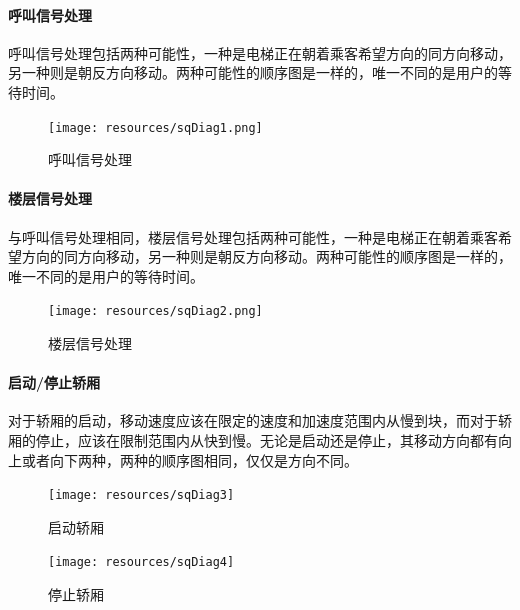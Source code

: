 \begin{minipage}{\textwidth}
\paragraph{呼叫信号处理}
呼叫信号处理包括两种可能性，一种是电梯正在朝着乘客希望方向的同方向移动，另一种则是朝反方向移动。两种可能性的顺序图是一样的，唯一不同的是用户的等待时间。
\begin{figure}[H]
	\centering
	\texttt{[image: resources/sqDiag1.png]}
	\caption{呼叫信号处理}
	\label{fig:sqDiag1}
\end{figure}
\end{minipage}

\begin{minipage}{\textwidth}
\paragraph{楼层信号处理}
与呼叫信号处理相同，楼层信号处理包括两种可能性，一种是电梯正在朝着乘客希望方向的同方向移动，另一种则是朝反方向移动。两种可能性的顺序图是一样的，唯一不同的是用户的等待时间。
\begin{figure}[H]
	\centering
	\texttt{[image: resources/sqDiag2.png]}
	\caption{楼层信号处理}
	\label{fig:sqDiag2}
\end{figure}
\end{minipage}

\begin{minipage}{\textwidth}
\paragraph{启动/停止轿厢}
对于轿厢的启动，移动速度应该在限定的速度和加速度范围内从慢到块，而对于轿厢的停止，应该在限制范围内从快到慢。无论是启动还是停止，其移动方向都有向上或者向下两种，两种的顺序图相同，仅仅是方向不同。
\begin{figure}[H]
	\begin{minipage}{0.58\textwidth}
		\centering
		\texttt{[image: resources/sqDiag3]}
		\caption{启动轿厢}
		\label{fig:sqDiag3}
	\end{minipage}
	\hfill
	\begin{minipage}{0.38\textwidth}
		\centering
		\texttt{[image: resources/sqDiag4]}
		\caption{停止轿厢}
		\label{fig:sqDiag4}
	\end{minipage}
\end{figure}
\end{minipage}

